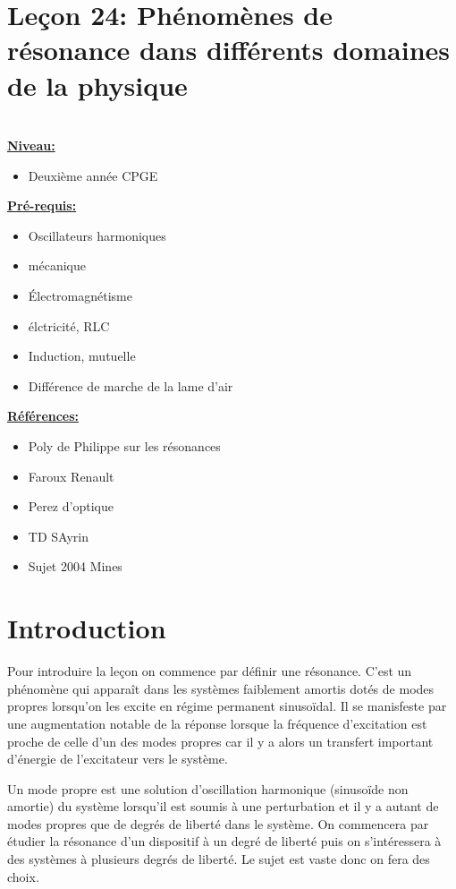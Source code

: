 \documentclass[french, a4paper, 10pt, twocolumn, landscape]{article}
\begin{document}
\section*{Leçon 24: Phénomènes de résonance dans différents domaines de la physique}

\hrulefill\\

\noindent\underline{\textbf{Niveau:}} 
\begin{itemize}
    \item Deuxième année CPGE
\end{itemize}

\noindent\underline{\textbf{Pré-requis:}}
\begin{itemize}
    \item Oscillateurs harmoniques
    \item mécanique
    \item Électromagnétisme
    \item élctricité, RLC
    \item Induction, mutuelle
    \item Différence de marche de la lame d'air
\end{itemize}

\noindent\underline{\textbf{Références:}}

\begin{itemize}
    \item Poly de Philippe sur les résonances
    \item Faroux Renault 
    \item Perez d'optique
    \item TD SAyrin 
    \item Sujet 2004 Mines
\end{itemize}

\hrulefill

\section*{Introduction}

Pour introduire la leçon on commence par définir une résonance. C'est un phénomène qui apparaît dans les systèmes faiblement amortis dotés de modes propres lorsqu'on les excite en régime permanent sinusoïdal. Il se manisfeste par une augmentation notable de la réponse lorsque la fréquence d'excitation est proche de celle d'un des modes propres car il y a alors un transfert important d'énergie de l'excitateur vers le système.\medskip
 
Un mode propre est une solution d’oscillation harmonique (sinusoïde non amortie) du système lorsqu’il
est soumis à une perturbation et il y a autant de modes propres que de degrés de liberté dans le
système. On commencera par étudier la résonance d'un dispositif à un degré de liberté puis on s'intéressera à des systèmes à plusieurs degrés de liberté. Le sujet est vaste donc on fera des choix.
\end{document}
